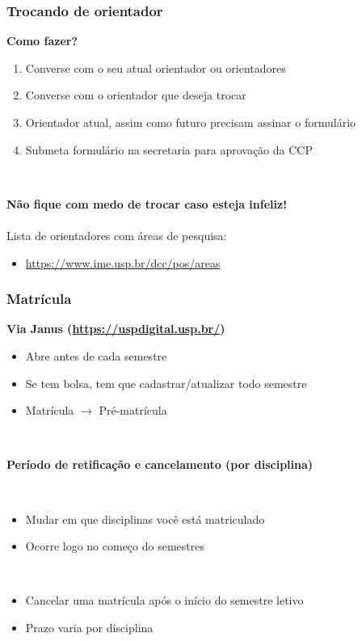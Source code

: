 \documentclass{beamer}
\begin{document}
\begin{frame}
  \frametitle{Trocando de orientador}

  \textbf{Como fazer?}
  \begin{enumerate}
    \item Converse com o seu atual orientador ou orientadores
    \item Converse com o orientador que deseja trocar
    \item Orientador atual, assim como futuro precisam assinar o formulário
    \item Submeta formulário na secretaria para aprovação da CCP
  \end{enumerate}~\\\pause

  \textbf{Não fique com medo de trocar caso esteja infeliz!}\\~\\

  Lista de orientadores com áreas de pesquisa:
  \begin{itemize}
    \item \url{https://www.ime.usp.br/dcc/pos/areas}
  \end{itemize}
\end{frame}

\begin{frame}
  \frametitle{Matrícula}

  \textbf{Via Janus (\url{https://uspdigital.usp.br/})}
  \begin{itemize}
    \item Abre antes de cada semestre
    \item Se tem bolsa, tem que cadastrar/atualizar todo semestre
    \item Matrícula $\to$ Pré-matrícula
  \end{itemize}~\\\pause

  \textbf{Período de retificação e cancelamento (por disciplina)}
  \begin{description}[Cancelamento]
    \item[Retificação:]~\\
      \begin{itemize}
        \item Mudar em que disciplinas você está matriculado
        \item Ocorre logo no começo do semestres
      \end{itemize}\pause
    \item[Cancelamento:]~\\
      \begin{itemize}
        \item Cancelar uma matrícula após o início do semestre letivo
        \item Prazo varia por disciplina
      \end{itemize}
  \end{description}
\end{frame}
\end{document}
